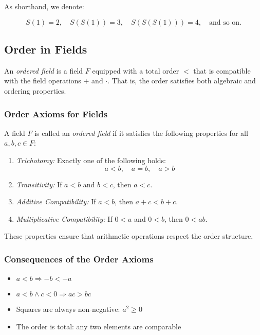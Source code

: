 As shorthand, we denote:

\[
	S(1) = 2, \quad S(S(1)) = 3, \quad S(S(S(1))) = 4, \quad \text{and so on.}
\]

\subsection{Order in Fields}

An \emph{ordered field} is a field \( F \) equipped with a total order \( < \) that is compatible with the field operations \( + \) and \( \cdot \). That is, the order satisfies both algebraic and ordering properties.

\subsubsection{Order Axioms for Fields}

A field \( F \) is called an \emph{ordered field} if it satisfies the following properties for all \( a, b, c \in F \):

\begin{enumerate}[label=\Roman*.]
    \item \emph{Trichotomy:} Exactly one of the following holds:
    \[
    a < b, \quad a = b, \quad a > b
    \]

    \item \emph{Transitivity:} If \( a < b \) and \( b < c \), then \( a < c \).

    \item \emph{Additive Compatibility:} If \( a < b \), then \( a + c < b + c \).

    \item \emph{Multiplicative Compatibility:} If \( 0 < a \) and \( 0 < b \), then \( 0 < ab \).
\end{enumerate}

These properties ensure that arithmetic operations respect the order structure.

\subsubsection{Consequences of the Order Axioms}

\begin{itemize}
    \item \( a < b \Rightarrow -b < -a \)
    \item \( a < b \land c < 0 \Rightarrow ac > bc \)
    \item Squares are always non-negative: \( a^2 \ge 0 \)
    \item The order is total: any two elements are comparable
\end{itemize}

